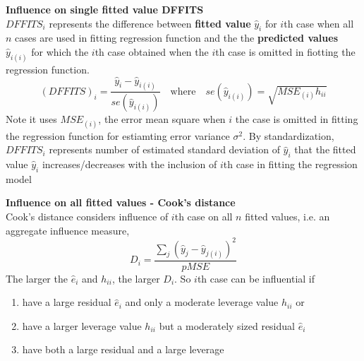 \documentclass[11pt]{article}
\begin{document}
\begin{defn*}
    \textbf{Influence on single fitted value DFFITS}\\
    $DFFITS_i$ represents the difference between \textbf{fitted value} $\hat{y}_i$ for $i$th case when all $n$ cases are used in fitting regression function and the the \textbf{predicted values} $\hat{y}_{i(i)}$ for which the $i$th case obtained when the $i$th case is omitted in fiotting the regression function.
    \[
        (DFFITS)_i = \frac{\hat{y}_i - \hat{y}_{i(i)}}{se(\hat{y}_{i(i)})} \quad \text{where} \quad 
        se(\hat{y}_{i(i)}) = \sqrt{MSE_{(i)} h_{ii}}
    \]
    Note it uses $MSE_{(i)}$, the error mean square when $i$ the case is omitted in fitting the regression function for estiamting error variance $\sigma^2$. By standardization, $DFFITS_i$ represents number of estimated standard deviation of $\hat{y}_i$ that the fitted value $\hat{y}_i$ increases/decreases with the inclusion of $i$th case in fitting the regression model
\end{defn*}

\begin{defn*}
    \textbf{Influence on all fitted values - Cook's distance} \\
    Cook's distance considers influence of $i$th case on all $n$ fitted values, i.e. an aggregate influence measure, 
    \[
        D_i = \frac{\sum_j (\hat{y}_j - \hat{y}_{j(i)})^2}{pMSE}
    \]
    The larger the $\hat{e}_i$ and $h_{ii}$, the larger $D_i$. So $i$th case can be influential if 
    \begin{enumerate}
        \item have a large residual $\hat{e}_i$ and only a moderate leverage value $h_{ii}$ or 
        \item have a larger leverage value $h_{ii}$ but a moderately sized residual $\hat{e}_i$ 
        \item have both a large residual and a large leverage
    \end{enumerate}
\end{defn*}
\end{document}
